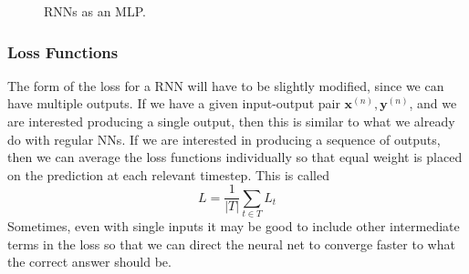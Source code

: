 \documentclass{article}
\begin{document}
\begin{figure}[H]
    \caption{RNNs as an MLP. } 
    \label{fig:mlp_vs_rnn}
  \end{figure}

  \subsubsection{Loss Functions}

    The form of the loss for a RNN will have to be slightly modified, since we can have multiple outputs. If we have a given input-output pair $\mathbf{x}^{(n)}, \mathbf{y}^{(n)}$, and we are interested producing a single output, then this is similar to what we already do with regular NNs. If we are interested in producing a sequence of outputs, then we can average the loss functions individually so that equal weight is placed on the prediction at each relevant timestep. This is called 
    \begin{equation}
      L = \frac{1}{|T|} \sum_{t \in T} L_t
    \end{equation}
    Sometimes, even with single inputs it may be good to include other intermediate terms in the loss so that we can direct the neural net to converge faster to what the correct answer should be. 
\end{document}
